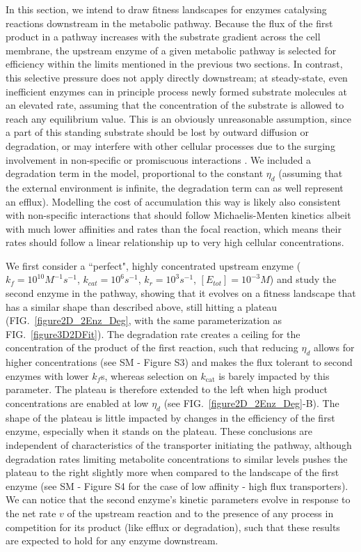 \documentclass[11pt,onecolumn]{article}
\begin{document}
In this section, we intend to draw fitness landscapes for enzymes catalysing reactions downstream in the metabolic pathway. Because the flux of the first product in a pathway increases with the substrate gradient across the cell membrane, the upstream enzyme of a given metabolic pathway is selected for efficiency within the limits mentioned in the previous two sections. In contrast, this selective pressure does not apply directly downstream; at steady-state, even inefficient enzymes can in principle process newly formed substrate molecules at an elevated rate, assuming that the concentration of the substrate is allowed to reach any equilibrium value. This is an obviously unreasonable assumption, since a part of this standing substrate should be lost by outward diffusion or degradation, or may interfere with other cellular processes due to the surging involvement in non-specific or promiscuous interactions \citep{Khersonsky10,Schauble13}. We included a degradation term in the model, proportional to the constant $\eta_{d}$ (assuming that the external environment is infinite, the degradation term can as well represent an efflux). Modelling the cost of accumulation this way is likely also consistent with non-specific interactions that should follow Michaelis-Menten kinetics albeit with much lower affinities and rates than the focal reaction, which means their rates should follow a linear relationship up to very high cellular concentrations.

We first consider a ``perfect", highly concentrated upstream enzyme ($k_f=10^{10}M^{-1}s^{-1}$, $k_{cat}=10^6s^{-1}$, $k_r=10^3s^{-1}$, $[E_{tot}]=10^{-3}M$) and study the second enzyme in the pathway, showing that it evolves on a fitness landscape that has a similar shape than described above, still hitting a plateau (FIG.~\ref{figure2D_2Enz_Deg}, with the same parameterization as FIG.~\ref{figure3D2DFit}). The degradation rate creates a ceiling for the concentration of the product of the first reaction, such that reducing $\eta_{d}$ allows for higher concentrations (see SM - Figure S3) and makes the flux tolerant to second enzymes with lower $k_f$s, whereas selection on $k_\text{cat}$ is barely impacted by this parameter. The plateau is therefore extended to the left when high product concentrations are enabled at low $\eta_{d}$ (see FIG.~\ref{figure2D_2Enz_Deg}-B). The shape of the plateau is little impacted by changes in the efficiency of the first enzyme, especially when it stands on the plateau. These conclusions are independent of characteristics of the transporter initiating the pathway, although degradation rates limiting metabolite concentrations to similar levels pushes the plateau to the right slightly more when compared to the landscape of the first enzyme (see SM - Figure S4 for the case of low affinity - high flux transporters). We can notice that the second enzyme's kinetic parameters evolve in response to the net rate $v$ of the upstream reaction and to the presence of any process in competition for its product (like efflux or degradation), such that these results are expected to hold for any enzyme downstream.
\end{document}
